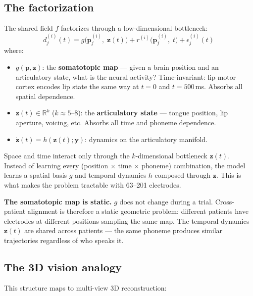 \documentclass[11pt,letterpaper]{article}
\newcommand{\bfp}{\mathbf{p}}
\newcommand{\bfz}{\mathbf{z}}
\newcommand{\bfy}{\mathbf{y}}
\newcommand{\R}{\mathbb{R}}
\begin{document}
\subsection{The factorization}\label{sec:factorization}

The shared field $f$ factorizes through a low-dimensional bottleneck:
\begin{equation}\label{eq:obs-function}
d_j^{(i)}(t) = g\bigl(\bfp_j^{(i)},\; \bfz(t)\bigr) + r^{(i)}\bigl(\bfp_j^{(i)},\; t\bigr) + \epsilon_j^{(i)}(t)
\end{equation}
where:
\begin{itemize}[leftmargin=2em]
\item $g(\bfp, \bfz)$: the \textbf{somatotopic map} --- given a brain position and an articulatory state, what is the neural activity? Time-invariant: lip motor cortex encodes lip state the same way at $t{=}0$ and $t{=}500$\,ms. Absorbs all spatial dependence.
\item $\bfz(t) \in \R^k$ ($k {\approx} 5$--$8$): the \textbf{articulatory state} --- tongue position, lip aperture, voicing, etc. Absorbs all time and phoneme dependence.
\item $\dot{\bfz}(t) = h(\bfz(t); \bfy)$: dynamics on the articulatory manifold.
\end{itemize}
Space and time interact only through the $k$-dimensional bottleneck $\bfz(t)$. Instead of learning every (position $\times$ time $\times$ phoneme) combination, the model learns a spatial basis $g$ and temporal dynamics $h$ composed through $\bfz$. This is what makes the problem tractable with 63--201 electrodes.

\textbf{The somatotopic map is static.} $g$ does not change during a trial. Cross-patient alignment is therefore a static geometric problem: different patients have electrodes at different positions sampling the same map. The temporal dynamics $\bfz(t)$ are shared across patients --- the same phoneme produces similar trajectories regardless of who speaks it.

\subsection{The 3D vision analogy}\label{sec:analogy}

This structure maps to multi-view 3D reconstruction:
\end{document}
